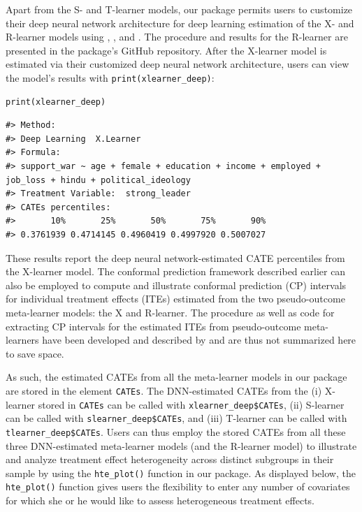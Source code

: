 Apart from the S- and T-learner models, our package permits users to
customize their deep neural network architecture for deep learning
estimation of the X- and R-learner models using ,
, and . The procedure and results for the
R-learner are presented in the package's GitHub repository. After the
X-learner model is estimated via their customized deep neural network
architecture, users can view the model's results with
\texttt{print(xlearner\_deep)}:

\begin{verbatim}
print(xlearner_deep)
\end{verbatim}

\begin{verbatim}
#> Method:
#> Deep Learning  X.Learner
#> Formula:
#> support_war ~ age + female + education + income + employed +      job_loss + hindu + political_ideology
#> Treatment Variable:  strong_leader
#> CATEs percentiles:
#>       10%       25%       50%       75%       90% 
#> 0.3761939 0.4714145 0.4960419 0.4997920 0.5007027
\end{verbatim}

These results report the deep neural network-estimated CATE percentiles
from the X-learner model. The conformal prediction framework described
earlier can also be employed to compute and illustrate conformal
prediction (CP) intervals for individual treatment effects (ITEs)
estimated from the two pseudo-outcome meta-learner models: the X and
R-learner. The procedure as well as code for extracting CP intervals for
the estimated ITEs from pseudo-outcome meta-learners have been developed
and described by \citet{Alaa2023conformal} and are thus not summarized here to
save space.

As such, the estimated CATEs from all the meta-learner models in our
package are stored in the element \texttt{CATEs}. The DNN-estimated CATEs from
the (i) X-learner stored in \texttt{CATEs} can be called with
\texttt{xlearner\_deep\$CATEs}, (ii) S-learner can be called with
\texttt{slearner\_deep\$CATEs}, and (iii) T-learner can be called with
\texttt{tlearner\_deep\$CATEs}. Users can thus employ the stored CATEs from all
these three DNN-estimated meta-learner models (and the R-learner model)
to illustrate and analyze treatment effect heterogeneity across distinct
subgroups in their sample by using the \texttt{hte\_plot()} function in our
package. As displayed below, the \texttt{hte\_plot()} function gives users the
flexibility to enter any number of covariates for which she or he would
like to assess heterogeneous treatment effects.

